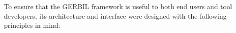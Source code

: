 




To ensure that the GERBIL framework is useful to both end users and tool developers, its architecture and interface were designed with the following principles in mind:

